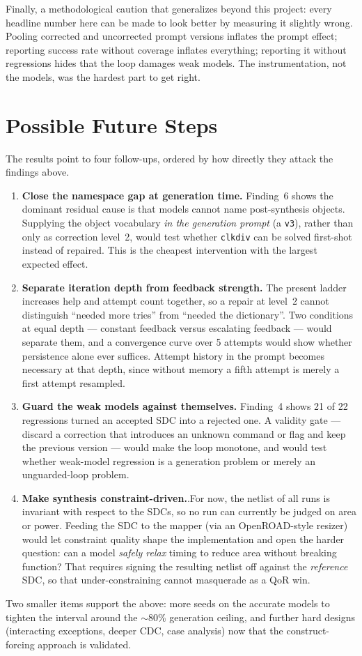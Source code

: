 \documentclass[11pt]{article}
\begin{document}
Finally, a methodological caution that generalizes beyond this project: every headline number here can be made to look better by measuring it slightly wrong. Pooling corrected and uncorrected prompt versions inflates the prompt effect; reporting success rate without coverage inflates everything; reporting it without regressions hides that the loop damages weak models. The instrumentation, not the models, was the hardest part to get right.

\section*{Possible Future Steps}
The results point to four follow-ups, ordered by how directly they attack the findings above.

\begin{enumerate}[leftmargin=*,nosep]
    \item \textbf{Close the namespace gap at generation time.} Finding~6 shows the dominant residual cause is that models cannot name post-synthesis objects. Supplying the object vocabulary \emph{in the generation prompt} (a \texttt{v3}), rather than only as correction level~2, would test whether \texttt{clkdiv} can be solved first-shot instead of repaired. This is the cheapest intervention with the largest expected effect.
    \item \textbf{Separate iteration depth from feedback strength.} The present ladder increases help and attempt count together, so a repair at level~2 cannot distinguish ``needed more tries'' from ``needed the dictionary''. Two conditions at equal depth --- constant feedback versus escalating feedback --- would separate them, and a convergence curve over 5 attempts would show whether persistence alone ever suffices. Attempt history in the prompt becomes necessary at that depth, since without memory a fifth attempt is merely a first attempt resampled.
    \item \textbf{Guard the weak models against themselves.} Finding~4 shows 21 of 22 regressions turned an accepted SDC into a rejected one. A validity gate --- discard a correction that introduces an unknown command or flag and keep the previous version --- would make the loop monotone, and would test whether weak-model regression is a generation problem or merely an unguarded-loop problem.
    \item \textbf{Make synthesis constraint-driven.}.For now, the netlist of all runs is invariant with respect to the SDCs, so no run can currently be judged on area or power. Feeding the SDC to the mapper (via an OpenROAD-style resizer) would let constraint quality shape the implementation and open the harder question: can a model \emph{safely relax} timing to reduce area without breaking function? That requires signing the resulting netlist off against the \emph{reference} SDC, so that under-constraining cannot masquerade as a QoR win.
\end{enumerate}

Two smaller items support the above: more seeds on the accurate models to tighten the interval around the $\sim$80\% generation ceiling, and further hard designs (interacting exceptions, deeper CDC, case analysis) now that the construct-forcing approach is validated.
\end{document}
